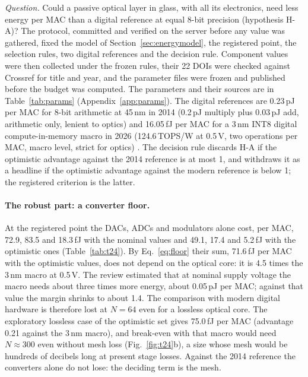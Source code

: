 \documentclass[11pt,a4paper]{article}
\newcommand{\fJ}{\,fJ\xspace}
\begin{document}
\emph{Question.} Could a passive optical layer in glass, with all its electronics, need less energy per MAC than a digital reference at equal 8-bit precision (hypothesis H-A)? The protocol, committed and verified on the server before any value was gathered, fixed the model of Section~\ref{sec:energymodel}, the registered point, the selection rules, two digital references and the decision rule. Component values were then collected under the frozen rules, their 22 DOIs were checked against Crossref for title and year, and the parameter files were frozen and published before the budget was computed. The parameters and their sources are in Table~\ref{tab:params} (Appendix~\ref{app:params}). The digital references are 0.23\,pJ per MAC for 8-bit arithmetic at 45\,nm in 2014 (0.2\,pJ multiply plus 0.03\,pJ add, arithmetic only, lenient to optics) \cite{Horowitz2014} and 16.05\fJ per MAC for a 3\,nm INT8 digital compute-in-memory macro in 2026 (124.6\,TOPS/W at 0.5\,V, two operations per MAC, macro level, strict for optics) \cite{Mori2026}. The decision rule discards H-A if the optimistic advantage against the 2014 reference is at most 1, and withdraws it as a headline if the optimistic advantage against the modern reference is below 1; the registered criterion is the latter.

\paragraph{The robust part: a converter floor.} At the registered point the DACs, ADCs and modulators alone cost, per MAC, 72.9, 83.5 and 18.3\fJ with the nominal values and 49.1, 17.4 and 5.2\fJ with the optimistic ones (Table~\ref{tab:t24}). By Eq.~\eqref{eq:floor} their sum, 71.6\fJ per MAC with the optimistic values, does not depend on the optical core: it is 4.5 times the 3\,nm macro at 0.5\,V. The review estimated that at nominal supply voltage the macro needs about three times more energy, about 0.05\,pJ per MAC; against that value the margin shrinks to about 1.4. The comparison with modern digital hardware is therefore lost at $N=64$ even for a lossless optical core. The exploratory lossless case of the optimistic set gives 75.0\fJ per MAC (advantage 0.21 against the 3\,nm macro), and break-even with that macro would need $N\approx300$ even without mesh loss (Fig.~\ref{fig:t24}b), a size whose mesh would be hundreds of decibels long at present stage losses. Against the 2014 reference the converters alone do not lose: the deciding term is the mesh.
\end{document}
